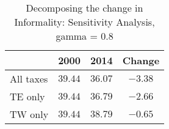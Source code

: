 \documentclass[12pt]{article}
\begin{document}
 \begin{table}[h]
 \caption{Decomposing the change in Informality: Sensitivity Analysis, gamma = 0.8}
 \begin{center}
 \label{results1}
 \begin{tabular}{lccc}
    & 2000 & 2014 & Change \\ \hline
  All taxes &  $39.44$ & $36.07$ & $-3.38$ \\ 
  TE only &  $39.44$ & $36.79$ & $-2.66$ \\ 
  TW only &  $39.44$ & $38.79$ & $-0.65$ \\ 
 \hline
 \end{tabular}
 \end{center}
 \end{table}
 
\end{document}
